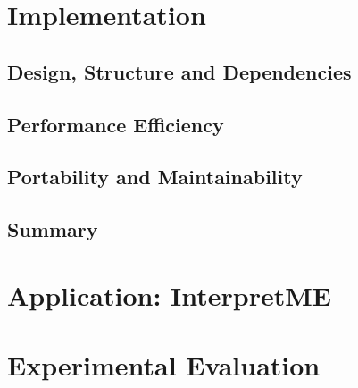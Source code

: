 \documentclass[11pt,a4paper, DIV=12]{report}
\begin{document}
        
        
    
        


\chapter{Implementation}
    \label{section_implemenation}
    
    \section{Design, Structure and Dependencies}
        \label{section_design_structure_dependencies}
        
    \section{Performance Efficiency}
        \label{section_performance_efficiency}
        
    \section{Portability and Maintainability}
        \label{section_portability_maintainability}
        
    \section{Summary}
        

\chapter{Application: InterpretME}
    
    \label{section_interpretme}

\chapter{Experimental Evaluation}
    \label{section_evaluation}
    
\end{document}
